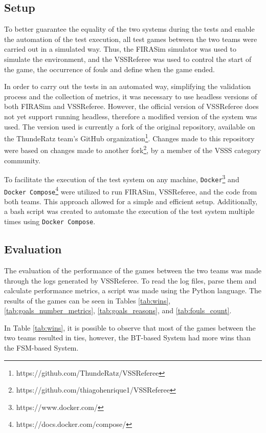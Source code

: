 \subsection{Setup}

To better guarantee the equality of the two systems during the tests and enable the automation of the test execution, all test games between the two teams were carried out in a simulated way. Thus, the FIRASim simulator was used to simulate the environment, and the VSSReferee was used to control the start of the game, the occurrence of fouls and define when the game ended.

In order to carry out the tests in an automated way, simplifying the validation process and the collection of metrics, it was necessary to use headless versions of both FIRASim and VSSReferee. However, the official version of VSSReferee does not yet support running headless, therefore a modified version of the system was used. The version used is currently a fork of the original repository, available on the ThundeRatz team's GitHub organization\footnote{https://github.com/ThundeRatz/VSSReferee}. Changes made to this repository were based on changes made to another fork\footnote{https://github.com/thiagohenrique1/VSSReferee}, by a member of the VSSS category community.

To facilitate the execution of the test system on any machine, \texttt{Docker}\footnote{https://www.docker.com/} and \texttt{Docker Compose}\footnote{https://docs.docker.com/compose/} were utilized to run FIRASim, VSSReferee, and the code from both teams. This approach allowed for a simple and efficient setup. Additionally, a bash script was created to automate the execution of the test system multiple times using \texttt{Docker Compose}.

\subsection{Evaluation}

The evaluation of the performance of the games between the two teams was made through the logs generated by VSSReferee. To read the log files, parse them and calculate performance metrics, a script was made using the Python language. The results of the games can be seen in Tables \ref{tab:wins}, \ref{tab:goals_number_metrics}, \ref{tab:goals_reasons}, and \ref{tab:fouls_count}.

In Table \ref{tab:wins}, it is possible to observe that most of the games between the two teams resulted in ties, however, the BT-based System had more wins than the FSM-based System.

